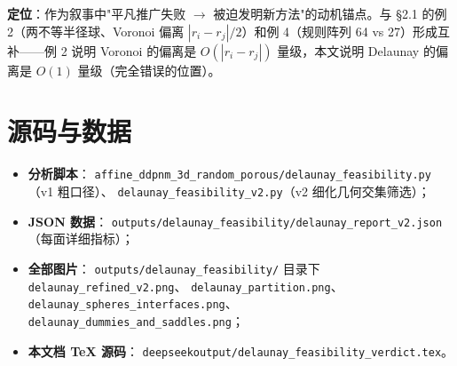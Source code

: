 \documentclass[UTF8,zihao=-4]{ctexart}
\begin{document}
\textbf{定位}：作为叙事中"平凡推广失败 $\to$ 被迫发明新方法"的动机锚点。与
§2.1 的例 2（两不等半径球、Voronoi 偏离 $|r_i-r_j|/2$）和例 4（规则阵列 64 vs
27）形成互补——例 2 说明 Voronoi 的偏离是 $O(|r_i-r_j|)$ 量级，本文说明 Delaunay
的偏离是 $O(1)$ 量级（完全错误的位置）。

\section{源码与数据}

\begin{itemize}
  \item \textbf{分析脚本}：
  \texttt{affine\_ddpnm\_3d\_random\_porous/delaunay\_feasibility.py}（v1 粗口径）、
  \texttt{delaunay\_feasibility\_v2.py}（v2 细化几何交集筛选）；
  \item \textbf{JSON 数据}：
  \texttt{outputs/delaunay\_feasibility/delaunay\_report\_v2.json}（每面详细指标）；
  \item \textbf{全部图片}：
  \texttt{outputs/delaunay\_feasibility/} 目录下
  \texttt{delaunay\_refined\_v2.png}、
  \texttt{delaunay\_partition.png}、
  \texttt{delaunay\_spheres\_interfaces.png}、
  \texttt{delaunay\_dummies\_and\_saddles.png}；
  \item \textbf{本文档 \TeX{} 源码}：
  \texttt{deepseekoutput/delaunay\_feasibility\_verdict.tex}。
\end{itemize}
\end{document}

